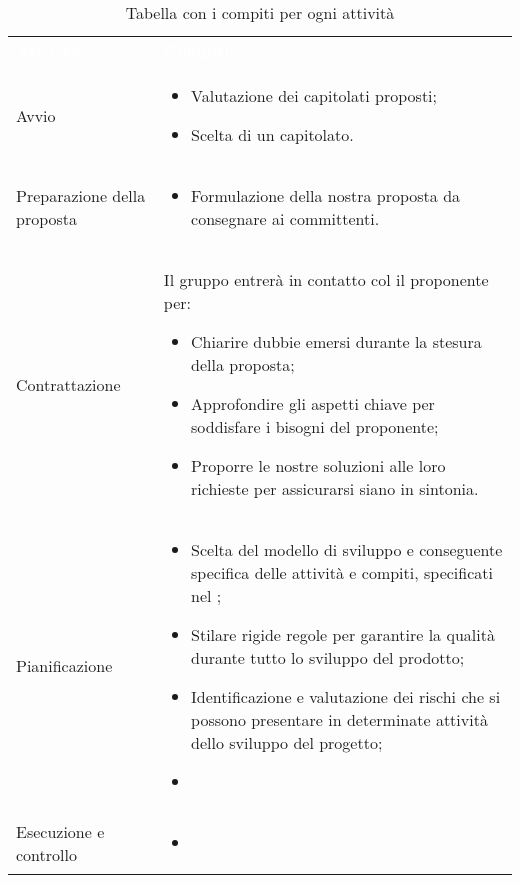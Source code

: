 {	
\renewcommand{\arraystretch}{2}
\centering
\begin{longtable}[h!]{ C{4cm} C{10cm}}
\caption{Tabella con i compiti per ogni attività}\\

\textcolor{white}{\textbf{Attività}} & \textcolor{white}{\textbf{Compiti}}\\

	Avvio & \begin{itemize} \item Valutazione dei capitolati proposti; \item Scelta di un capitolato. \end{itemize}\\
	Preparazione della proposta & \begin{itemize} \item Formulazione della nostra proposta da consegnare ai committenti. \end{itemize}\\
	Contrattazione & Il gruppo entrerà in contatto col il proponente per: \begin{itemize} \item Chiarire dubbie emersi durante la stesura della proposta; \item Approfondire gli aspetti chiave per soddisfare i bisogni del proponente; \item Proporre le nostre soluzioni alle loro richieste per assicurarsi siano in sintonia. \end{itemize}\\
	Pianificazione & \begin{itemize} \item Scelta del modello di sviluppo e conseguente specifica delle attività e compiti, specificati nel \PdP{}; \item Stilare rigide regole per garantire la qualità durante tutto lo sviluppo del prodotto; \item Identificazione e valutazione dei rischi che si possono presentare in determinate attività dello sviluppo del progetto; \item \end{itemize}\\
	Esecuzione e controllo & \begin{itemize} \item   \end{itemize}\\
\end{longtable}
}

